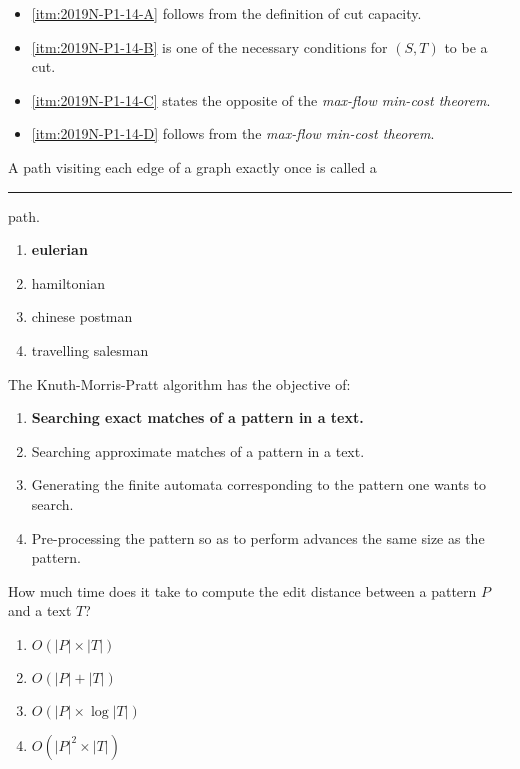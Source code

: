 {\ansseparator

\newpage
\begin{itemize}
    \item[] \ref{itm:2019N-P1-14-A} follows from the definition of cut capacity.
    \item[] \ref{itm:2019N-P1-14-B} is one of the necessary conditions for $(S,T)$ to be a cut.
    \item[] \ref{itm:2019N-P1-14-C} states the opposite of the \emph{max-flow min-cost theorem}.
    \item[] \ref{itm:2019N-P1-14-D} follows from the \emph{max-flow min-cost theorem}.  
\end{itemize}

A path visiting each edge of a graph exactly once is called a \rule{2.5cm}{0.15mm} path.
\begin{enumerate}[label=\Alph*)]\itemsep0em
    \item \textbf{eulerian \greencheckmark}
    \item hamiltonian
    \item chinese postman
    \item travelling salesman
\end{enumerate}

The Knuth-Morris-Pratt algorithm has the objective of:
\begin{enumerate}[label=\Alph*)]\itemsep0em
    \item \textbf{Searching exact matches of a pattern in a text. \greencheckmark}
    \item Searching approximate matches of a pattern in a text.
    \item Generating the finite automata corresponding to the pattern one wants to search.
    \item Pre-processing the pattern so as to perform advances the same size as the pattern.
\end{enumerate}

How much time does it take to compute the edit distance between a pattern $P$ and a text $T$?
\begin{enumerate}[label=\Alph*)]\itemsep0em
    \item $O(|P| \times |T|)$ \greencheckmark
    \item $O(|P| + |T|)$
    \item $O(|P| \times \log |T|)$
    \item $O(|P|^2 \times |T|)$
\end{enumerate}

}
